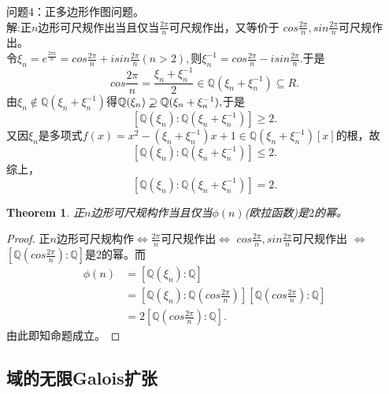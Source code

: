 \documentclass[UTF8]{article}
\newtheorem{thm}{Theorem}[section]
\begin{document}
问题4：正多边形作图问题。\\
解:正$n$边形可尺规作出当且仅当$\frac{2\pi}{n}$可尺规作出，又等价于
$cos\frac{2\pi}{n},sin\frac{2\pi}{n}$可尺规作出。\\
令$\xi_{n}=e^{\frac{2\pi i}{n}}=cos\frac{2\pi}{n}+isin\frac{2\pi}{n}(n>2),$则$
\xi_{n}^{-1}=cos\frac{2\pi}{n}-isin\frac{2\pi}{n}
.$于是
$$
cos\frac{2\pi}{n}=\frac{\xi_{n}+\xi_{n}^{-1}}{2}\in \mathbb{Q}(\xi_{n}+\xi_{n}^{-1})\subseteq R.
$$
由$\xi_{n}\notin \mathbb{Q}(\xi_{n}+\xi_{n}^{-1})$得$\mathbb{Q}(\xi_{n})\varsupsetneq \mathbb{Q}(\xi_{n}+\xi_{n}^{-1}),$于是
$$
[\mathbb{Q}(\xi_{n}):\mathbb{Q}(\xi_{n}+\xi_{n}^{-1})]\geq 2.
$$
又因$\xi_{n}$是多项式$f(x)=x^{2}-(\xi_{n}+\xi_{n}^{-1})x+1\in\mathbb{Q}(\xi_{n}+\xi_{n}^{-1})[x]$的根，故
$$
[\mathbb{Q}(\xi_{n}):\mathbb{Q}(\xi_{n}+\xi_{n}^{-1})]\leq 2.
$$
综上，
$$
[\mathbb{Q}(\xi_{n}):\mathbb{Q}(\xi_{n}+\xi_{n}^{-1})]=2.
$$

\begin{thm}正$n$边形可尺规构作当且仅当$\phi(n)$(欧拉函数)是$2$的幂。
	\end{thm}
\begin{proof}
	正$n$边形可尺规构作$\Leftrightarrow$$\frac{2\pi}{n}$可尺规作出$\Leftrightarrow$
	$cos\frac{2\pi}{n},sin\frac{2\pi}{n}$可尺规作出
	$\Leftrightarrow$ $[\mathbb{Q}(cos\frac{2\pi}{n}):\mathbb{Q}]$是$2$的幂。而
	\[
	\begin{split}
	\phi(n)&=[\mathbb{Q}(\xi_{n}):\mathbb{Q}]\\
	&=[\mathbb{Q}(\xi_{n}):\mathbb{Q}(cos\frac{2\pi}{n})]
	[\mathbb{Q}(cos\frac{2\pi}{n}):\mathbb{Q}]\\
	&=2	[\mathbb{Q}(cos\frac{2\pi}{n}):\mathbb{Q}].
	\end{split}
	\]
	由此即知命题成立。
\end{proof}
\subsection{域的无限Galois扩张}
\end{document}
